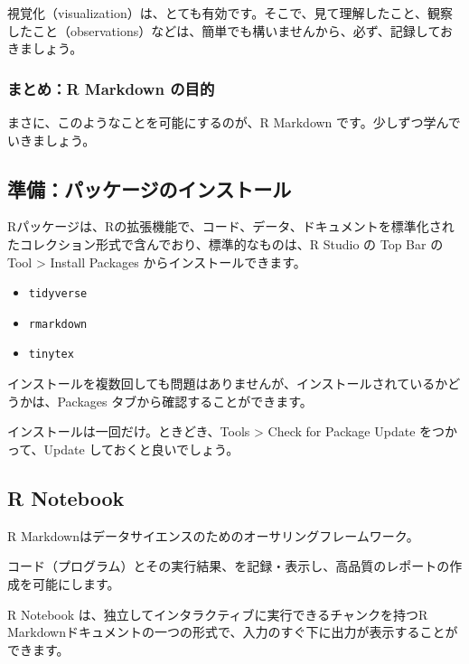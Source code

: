 \documentclass[
]{bxjsbook}
\providecommand{\tightlist}{%
  \setlength{\itemsep}{0pt}\setlength{\parskip}{0pt}}
\theoremstyle{definition}
\theoremstyle{definition}
\theoremstyle{definition}
\theoremstyle{definition}
\theoremstyle{remark}
\begin{document}
視覚化（visualization）は、とても有効です。そこで、見て理解したこと、観察したこと（observations）などは、簡単でも構いませんから、必ず、記録しておきましょう。

\hypertarget{ux307eux3068ux3081r-markdown-ux306eux76eeux7684}{%
\subsubsection{まとめ：R Markdown の目的}\label{ux307eux3068ux3081r-markdown-ux306eux76eeux7684}}

まさに、このようなことを可能にするのが、R Markdown です。少しずつ学んでいきましょう。

\hypertarget{ux6e96ux5099ux30d1ux30c3ux30b1ux30fcux30b8ux306eux30a4ux30f3ux30b9ux30c8ux30fcux30eb}{%
\subsection{準備：パッケージのインストール}\label{ux6e96ux5099ux30d1ux30c3ux30b1ux30fcux30b8ux306eux30a4ux30f3ux30b9ux30c8ux30fcux30eb}}

Rパッケージは、Rの拡張機能で、コード、データ、ドキュメントを標準化されたコレクション形式で含んでおり、標準的なものは、R Studio の Top Bar の Tool \textgreater{} Install Packages からインストールできます。

\begin{itemize}
\tightlist
\item
  \texttt{tidyverse}
\item
  \texttt{rmarkdown}
\item
  \texttt{tinytex}
\end{itemize}

インストールを複数回しても問題はありませんが、インストールされているかどうかは、Packages タブから確認することができます。

インストールは一回だけ。ときどき、Tools \textgreater{} Check for Package Update をつかって、Update しておくと良いでしょう。

\hypertarget{r-notebook}{%
\subsection{R Notebook}\label{r-notebook}}

R Markdownはデータサイエンスのためのオーサリングフレームワーク。

コード（プログラム）とその実行結果、を記録・表示し、高品質のレポートの作成を可能にします。

R Notebook は、独立してインタラクティブに実行できるチャンクを持つR Markdownドキュメントの一つの形式で、入力のすぐ下に出力が表示することができます。
\end{document}
